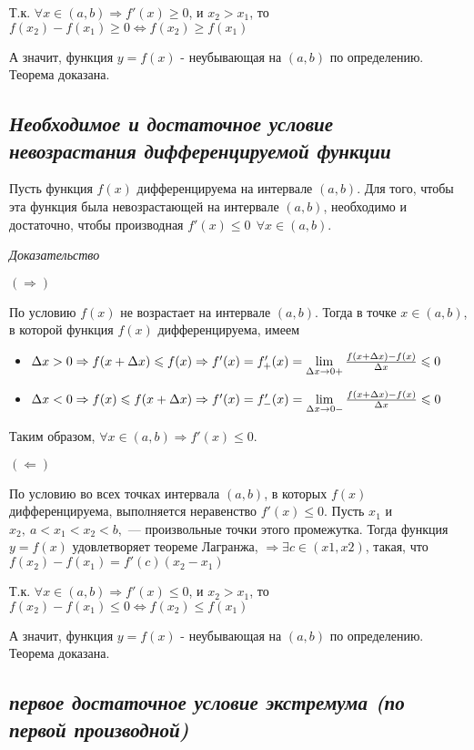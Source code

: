Т.к. $\forall x \in (a, b) \Rightarrow f'(x) \geqslant 0$, и $x_2 > x_1$, то $f(x_2) - f(x_1) \geqslant 0 \iff f(x_2) \geqslant  f(x_1) $

А значит, функция $y = f(x)$ - неубывающая на $(a, b)$ по определению. Теорема доказана.
\subsection{\textit{Необходимое и достаточное условие невозрастания дифференцируемой функции}}

Пусть функция $f(x)$ дифференцируема на интервале $(a, b)$. Для того, чтобы эта функция была невозрастающей на интервале $(a, b)$, необходимо и достаточно, чтобы производная $f'(x) \leqslant 0 \ \ \forall x \in (a, b).$

\textit{Доказательство}

$(\Rightarrow)$

По условию $f(x)$ не возрастает на интервале $(a, b)$. Тогда в точке $x \in (a, b)$, в которой функция $f(x)$ дифференцируема, имеем
\begin{itemize}

\item $\Delta x > 0\Rightarrow
f(x + \Delta x) \leqslant f(x)
\Rightarrow f'(x) = f'_+(x) = \lim\limits_{\Delta x \to 0+ }{\Large\frac{f(x + \Delta x) - f(x)}{\Delta x}} \leqslant 0$
\item $\Delta x < 0\Rightarrow f(x) \leqslant f(x + \Delta x) \Rightarrow f'(x) = f'_-(x) = \lim\limits_{\Delta x \to 0-}{\Large\frac{f(x + \Delta x) - f(x)}{\Delta x}} \leqslant 0$

\end{itemize}

Таким образом, $\forall x \in (a, b) \Rightarrow f'(x) \leqslant 0$.

$(\Leftarrow)$

По условию во всех точках интервала $(a,b)$, в которых $f(x)$ дифференцируема, выполняется неравенство $f'(x) \leqslant 0$. Пусть $x_1$ и $x_2,\ a < x_1 < x_2 < b,$ — произвольные точки этого промежутка. Тогда функция $y = f(x)$ удовлетворяет теореме Лагранжа, $\Rightarrow  \exists c \in (x1, x2)$, такая, что $f(x_2) - f(x_1) = f'(c)(x_2 - x_1)$

Т.к. $\forall x \in (a, b) \Rightarrow f'(x) \leqslant 0$, и $x_2 > x_1$, то $f(x_2) - f(x_1) \leqslant 0 \iff f(x_2) \leqslant  f(x_1)$

А значит, функция $y = f(x)$ - неубывающая на $(a, b)$ по определению. Теорема доказана.
\subsection{\textit{первое достаточное условие экстремума (по первой производной)}}


